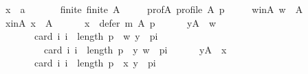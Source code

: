 \begin{isabellebody}
\ \ \ \ x\ {\isacharcolon}{\kern0pt}{\isacharcolon}{\kern0pt}\ {\isachardoublequoteopen}{\isacharprime}{\kern0pt}a{\isachardoublequoteclose}\isanewline
\ \ \isamarkupfalse%
\isanewline
\ \ \ \ finite{\isacharcolon}{\kern0pt}\ {\isachardoublequoteopen}finite\ A{\isachardoublequoteclose}\ \isanewline
\ \ \ \ prof{\isacharunderscore}{\kern0pt}A{\isacharcolon}{\kern0pt}\ {\isachardoublequoteopen}profile\ A\ p{\isachardoublequoteclose}\ \isanewline
\ \ \ \ w{\isacharunderscore}{\kern0pt}in{\isacharunderscore}{\kern0pt}A{\isacharcolon}{\kern0pt}\ {\isachardoublequoteopen}w\ {\isasymin}\ A{\isachardoublequoteclose}\ \isanewline
\ \ \ \ x{\isacharunderscore}{\kern0pt}in{\isacharunderscore}{\kern0pt}A{\isacharcolon}{\kern0pt}\ {\isachardoublequoteopen}x\ {\isasymin}\ A{\isachardoublequoteclose}\ \isanewline
\ \ \ \ {}{\isacharcolon}{\kern0pt}\ {\isachardoublequoteopen}x\ {\isasymnotin}\ defer\ m\ A\ p{\isachardoublequoteclose}\ \isanewline
\ \ \ \ {}{\isacharcolon}{\kern0pt}\ {\isachardoublequoteopen}{\isasymforall}y{\isasymin}A\ {\isacharminus}{\kern0pt}\ {\isacharbraceleft}{\kern0pt}w{\isacharbraceright}{\kern0pt}{\isachardot}{\kern0pt}\isanewline
\ \ \ \ \ \ \ \ \ \ card\ {\isacharbraceleft}{\kern0pt}i{\isachardot}{\kern0pt}\ i\ {\isacharless}{\kern0pt}\ length\ p\ {\isasymand}\ {\isacharparenleft}{\kern0pt}w{\isacharcomma}{\kern0pt}\ y{\isacharparenright}{\kern0pt}\ {\isasymin}\ {\isacharparenleft}{\kern0pt}p{\isacharbang}{\kern0pt}i{\isacharparenright}{\kern0pt}{\isacharbraceright}{\kern0pt}\ {\isacharless}{\kern0pt}\isanewline
\ \ \ \ \ \ \ \ \ \ \ \ card\ {\isacharbraceleft}{\kern0pt}i{\isachardot}{\kern0pt}\ i\ {\isacharless}{\kern0pt}\ length\ p\ {\isasymand}\ {\isacharparenleft}{\kern0pt}y{\isacharcomma}{\kern0pt}\ w{\isacharparenright}{\kern0pt}\ {\isasymin}\ {\isacharparenleft}{\kern0pt}p{\isacharbang}{\kern0pt}i{\isacharparenright}{\kern0pt}{\isacharbraceright}{\kern0pt}{\isachardoublequoteclose}\ \isanewline
\ \ \ \ {}{\isacharcolon}{\kern0pt}\ {\isachardoublequoteopen}{\isasymforall}y{\isasymin}A\ {\isacharminus}{\kern0pt}\ {\isacharbraceleft}{\kern0pt}x{\isacharbraceright}{\kern0pt}{\isachardot}{\kern0pt}\isanewline
\ \ \ \ \ \ \ \ \ \ card\ {\isacharbraceleft}{\kern0pt}i{\isachardot}{\kern0pt}\ i\ {\isacharless}{\kern0pt}\ length\ p\ {\isasymand}\ {\isacharparenleft}{\kern0pt}x{\isacharcomma}{\kern0pt}\ y{\isacharparenright}{\kern0pt}\ {\isasymin}\ {\isacharparenleft}{\kern0pt}p{\isacharbang}{\kern0pt}i{\isacharparenright}{\kern0pt}{\isacharbraceright}{\kern0pt}\ {\isacharless}{\kern0pt}\isanewline

\end{isabellebody}
